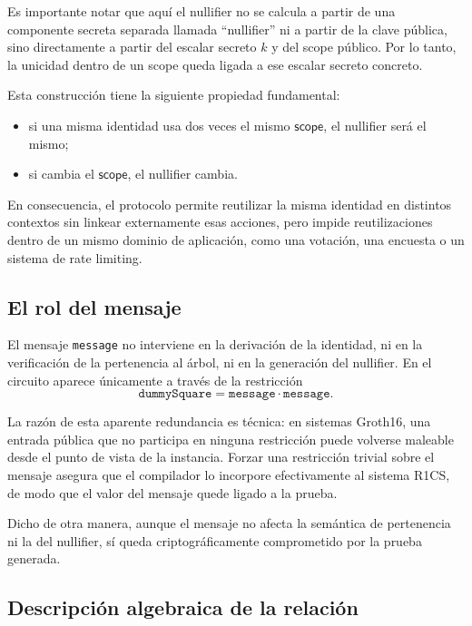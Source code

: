 \documentclass[11pt,a4paper]{article}
\begin{document}
	Es importante notar que aquí el nullifier no se calcula a partir de una componente secreta separada llamada ``nullifier'' ni a partir de la clave pública, sino directamente a partir del escalar secreto \(k\) y del scope público. Por lo tanto, la unicidad dentro de un scope queda ligada a ese escalar secreto concreto.
	
	Esta construcción tiene la siguiente propiedad fundamental:
	\begin{itemize}
		\item si una misma identidad usa dos veces el mismo \(\mathsf{scope}\), el nullifier será el mismo;
		\item si cambia el \(\mathsf{scope}\), el nullifier cambia.
	\end{itemize}
	
	En consecuencia, el protocolo permite reutilizar la misma identidad en distintos contextos sin linkear externamente esas acciones, pero impide reutilizaciones dentro de un mismo dominio de aplicación, como una votación, una encuesta o un sistema de rate limiting.
	
	\subsection{El rol del mensaje}
	
	El mensaje \texttt{message} no interviene en la derivación de la identidad, ni en la verificación de la pertenencia al árbol, ni en la generación del nullifier. En el circuito aparece únicamente a través de la restricción
	\[
	\texttt{dummySquare} = \texttt{message} \cdot \texttt{message}.
	\]
	
	La razón de esta aparente redundancia es técnica: en sistemas Groth16, una entrada pública que no participa en ninguna restricción puede volverse maleable desde el punto de vista de la instancia. Forzar una restricción trivial sobre el mensaje asegura que el compilador lo incorpore efectivamente al sistema R1CS, de modo que el valor del mensaje quede ligado a la prueba.
	
	Dicho de otra manera, aunque el mensaje no afecta la semántica de pertenencia ni la del nullifier, sí queda criptográficamente comprometido por la prueba generada.
	
	\subsection{Descripción algebraica de la relación}
	
\end{document}
